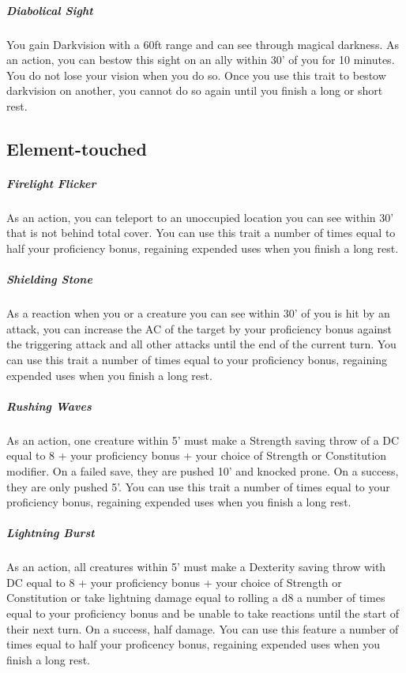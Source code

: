 \subparagraph*{Diabolical Sight}  You gain Darkvision with a 60ft range and can see through magical darkness. As an action, you can bestow this sight on an ally within 30' of you for 10 minutes. You do not lose your vision when you do so. Once you use this trait to bestow darkvision on another, you cannot do so again until you finish a long or short rest.

\subsection{Element-touched}

\subparagraph*{Firelight Flicker}  As an action, you can teleport to an unoccupied location you can see within 30' that is not behind total cover. You can use this trait a number of times equal to half your proficiency bonus, regaining expended uses when you finish a long rest.

\subparagraph*{Shielding Stone}  As a reaction when you or a creature you can see within 30' of you is hit by an attack, you can increase the AC of the target by your proficiency bonus against the triggering attack and all other attacks until the end of the current turn. You can use this trait a number of times equal to your proficiency bonus, regaining expended uses when you finish a long rest.

\subparagraph*{Rushing Waves}  As an action, one creature within 5' must make a Strength saving throw of a DC equal to 8 + your proficiency bonus + your choice of Strength or Constitution modifier. On a failed save, they are pushed 10' and knocked prone. On a success, they are only pushed 5'. You can use this trait a number of times equal to your proficiency bonus, regaining expended uses when you finish a long rest.

\subparagraph*{Lightning Burst}  As an action, all creatures within 5' must make a Dexterity saving throw with DC equal to 8 + your proficiency bonus + your choice of Strength or Constitution or take lightning damage equal to rolling a d8 a number of times equal to your proficiency bonus and be unable to take reactions until the start of their next turn. On a success, half damage. You can use this feature a number of times equal to half your proficency bonus, regaining expended uses when you finish a long rest.
